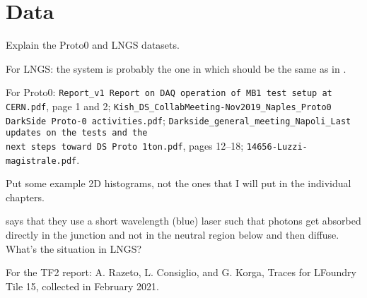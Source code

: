 \chapter{Data}
\label{ch:data}

Explain the Proto0 and LNGS datasets.

For LNGS: the system is probably the one in \cite{savarese2018} which should be
the same as in \cite{acerbi2017}.

For Proto0: \nolinkurl{Report_v1 Report on DAQ operation of MB1 test setup at
CERN.pdf}, page 1 and 2; \nolinkurl{Kish_DS_CollabMeeting-Nov2019_Naples_Proto0
DarkSide Proto-0 activities.pdf};
\nolinkurl{Darkside_general_meeting_Napoli_Last updates on the tests and the
next steps toward DS Proto 1ton.pdf}, pages 12--18;
\nolinkurl{14656-Luzzi-magistrale.pdf}.

Put some example 2D histograms, not the ones that I will put in the individual
chapters.

\cite[p.~2, after eq.~5]{nagy2014} says that they use a short wavelength (blue)
laser such that photons get absorbed directly in the junction and not in the
neutral region below and then diffuse. What's the situation in LNGS?

For the TF2 report: A. Razeto, L. Consiglio, and G. Korga, Traces for LFoundry
Tile 15, collected in February 2021.

